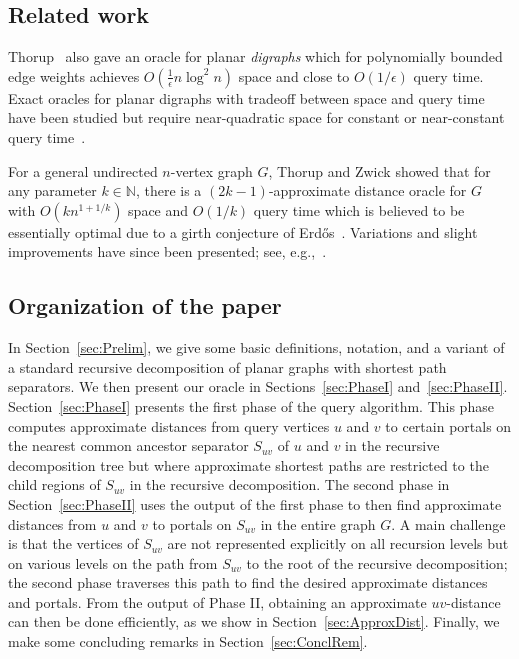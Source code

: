 \documentclass[11pt]{article}
\begin{document}
\subsection{Related work}
Thorup~\cite{OraclePlanarThorup} also gave an oracle for planar \emph{digraphs} which for polynomially bounded edge weights achieves $O(\frac 1\epsilon n\log^2n)$ space and close to $O(1/\epsilon)$ query time. Exact oracles for planar digraphs with tradeoff between space and query time have been studied but require near-quadratic space for constant or near-constant query time~\cite{ExactOraclePlanarMozesSommer,CWNPHD}.

For a general undirected $n$-vertex graph $G$, Thorup and Zwick showed that for any parameter $k\in\mathbb N$, there is a $(2k-1)$-approximate distance oracle for $G$ with $O(kn^{1+1/k})$ space and $O(1/k)$ query time which is believed to be essentially optimal due to a girth conjecture of Erd\H{o}s~\cite{Erdos}. Variations and slight improvements have since been presented; see, e.g.,~\cite{ChechikOracleGeneral,MendelNaor,PatrascuRoditty,CWNOracleGeneral1,CWNOracleGeneral2}.

\subsection{Organization of the paper}
In Section~\ref{sec:Prelim}, we give some basic definitions, notation, and a variant of a standard recursive decomposition of planar graphs with shortest path separators. We then present our oracle in Sections~\ref{sec:PhaseI} and~\ref{sec:PhaseII}. Section~\ref{sec:PhaseI} presents the first phase of the query algorithm. This phase computes approximate distances from query vertices $u$ and $v$ to certain portals on the nearest common ancestor separator $S_{uv}$ of $u$ and $v$ in the recursive decomposition tree but where approximate shortest paths are restricted to the child regions of $S_{uv}$ in the recursive decomposition. The second phase in Section~\ref{sec:PhaseII} uses the output of the first phase to then find approximate distances from $u$ and $v$ to portals on $S_{uv}$ in the entire graph $G$. A main challenge is that the vertices of $S_{uv}$ are not represented explicitly on all recursion levels but on various levels on the path from $S_{uv}$ to the root of the recursive decomposition; the second phase traverses this path to find the desired approximate distances and portals. From the output of Phase II, obtaining an approximate $uv$-distance can then be done efficiently, as we show in Section~\ref{sec:ApproxDist}. Finally, we make some concluding remarks in Section~\ref{sec:ConclRem}.
\end{document}
